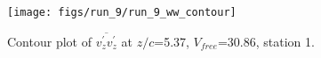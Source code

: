 \begin{figure}[H]
\centering
\texttt{[image: figs/run\_9/run\_9\_ww\_contour]}
\caption{Contour plot of $\overline{v_{z}^{\prime} v_{z}^{\prime}}$ at $z/c$=5.37, $V_{free}$=30.86, station 1.}
\label{fig:run_9_ww_contour}
\end{figure}


